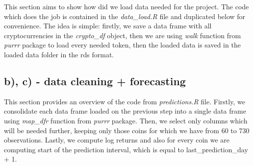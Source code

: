 \documentclass[
]{article}
\newenvironment{Shaded}{\begin{snugshade}}{\end{snugshade}}
\newcommand{\AttributeTok}[1]{\textcolor[rgb]{0.13,0.29,0.53}{#1}}
\newcommand{\DecValTok}[1]{\textcolor[rgb]{0.00,0.00,0.81}{#1}}
\newcommand{\FunctionTok}[1]{\textcolor[rgb]{0.13,0.29,0.53}{\textbf{#1}}}
\newcommand{\NormalTok}[1]{#1}
\newcommand{\OtherTok}[1]{\textcolor[rgb]{0.56,0.35,0.01}{#1}}
\newcommand{\SpecialCharTok}[1]{\textcolor[rgb]{0.81,0.36,0.00}{\textbf{#1}}}
\newcommand{\StringTok}[1]{\textcolor[rgb]{0.31,0.60,0.02}{#1}}
\begin{document}
This section aims to show how did we load data needed for the project.
The code which does the job is contained in the \emph{data\_load.R} file
and duplicated below for convenience. The idea is simple: firstly, we
save a data frame with all cryptocurrencies in the \emph{crypto\_df}
object, then we are using \emph{walk} function from \emph{purrr} package
to load every needed token, then the loaded data is saved in the loaded
data folder in the rds format.

\begin{Shaded}
\end{Shaded}

\newpage

\subsection{b), c) - data cleaning +
forecasting}\label{b-c---data-cleaning-forecasting}

This section provides an overview of the code from \emph{predictions.R}
file. Firstly, we consolidate each data frame loaded on the previous
step into a single data frame using \emph{map\_dfr} function from
\emph{purrr} package. Then, we select only columns which will be needed
further, keeping only those coins for which we have from 60 to 730
observations. Lastly, we compute log returns and also for every coin we
are computing start of the prediction interval, which is equal to
last\_prediction\_day + 1.
\end{document}
